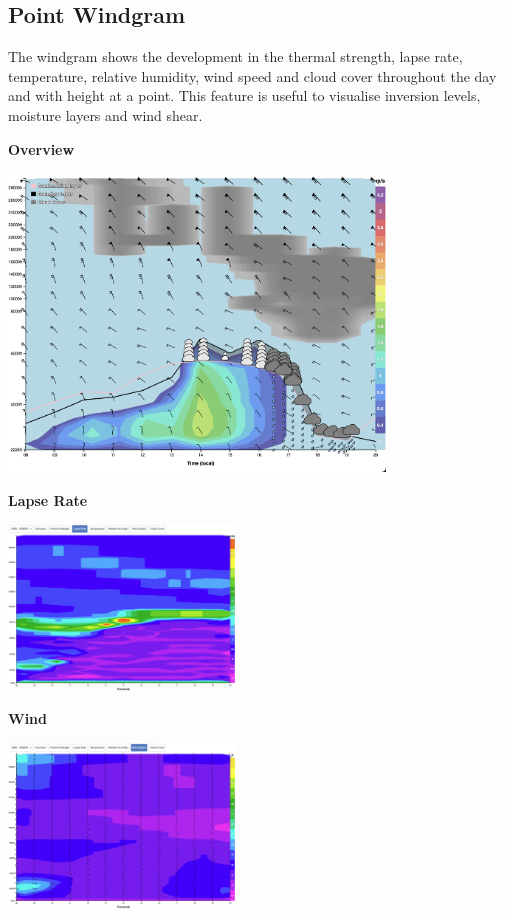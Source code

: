 \documentclass[11pt,a4paper]{article}
\begin{document}
\subsection{Point Windgram}
The windgram shows the development in the thermal strength, lapse rate, temperature, relative humidity, wind speed and cloud cover throughout the day and with height at a point. This feature is useful to visualise inversion levels, moisture layers and wind shear.
\begin{center}
\begin{minipage}{\textwidth}
\centering
\textbf{Overview}

\includegraphics[width=10cm]{images/windgram_overview.png}
\end{minipage}

\begin{minipage}{0.45\textwidth}
\centering
\textbf{Lapse Rate}

\includegraphics[width=6cm]{images/windgram_lapse.png}
\end{minipage}
\hfill
\begin{minipage}{0.45\textwidth}
\centering
\textbf{Wind}

\includegraphics[width=6cm]{images/windgram_wind.png}
\end{minipage}
\end{center}
\end{document}
